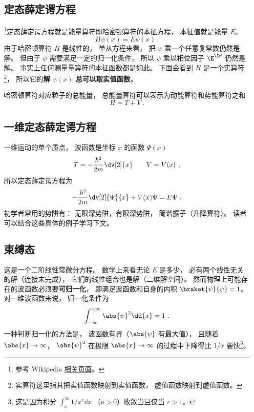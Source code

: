 

\subsection{定态薛定谔方程}
\footnote{参考 Wikipedia \href{https://en.wikipedia.org/wiki/Finite_potential_well}{相关页面}。}定态薛定谔方程就是能量算符即哈密顿算符的本征方程， 本征值就是能量 $E$。
\begin{equation}
H \psi(x) = E \psi(x)~.
\end{equation}
由于哈密顿算符 $H$ 是线性的， 单从方程来看， 把 $\psi$ 乘一个任意复常数仍然是解。 但由于 $\psi$ 需要满足一定的归一化条件， 所以 $\psi$ 乘以相位因子 $\E^{\I\theta}$ 仍然是解。 事实上任何测量量算符的本征函数都是如此。 下面会看到 $H$ 是一个实算符\footnote{实算符这里指其把实值函数映射到实值函数， 虚值函数映射到虚值函数。}， 所以它的\textbf{解 $\psi(x)$ 总可以取实值函数}。

哈密顿算符对应粒子的总能量， 总能量算符可以表示为动能算符和势能算符之和
\begin{equation}
H = T + V~.
\end{equation}

\subsection{一维定态薛定谔方程}
一维运动的单个质点， 波函数是坐标 $x$ 的函数 $\Psi(x)$
\begin{equation}
T = -\frac{\hbar^2}{2m} \dv[2]{x} \qquad V = V(x)~,
\end{equation}
所以定态薛定谔方程为
\begin{equation}\label{eq_SchEq_1}
-\frac{\hbar^2}{2m} \dv[2]{\Psi}{x} + V(x)\Psi = E \Psi~.
\end{equation}
初学者常用的势阱有： 无限深势阱，有限深势阱， 简谐振子（升降算符）。 读者可以结合这些具体的例子学习下文。

\subsection{束缚态}
这是一个二阶线性常微分方程。 数学上来看无论 $E$ 是多少， 必有两个线性无关的解（连接未完成）， 它们的线性组合也是解（二维解空间）。 然而物理上可能存在的波函数必须要\textbf{可归一化}， 即满足波函数和自身的内积 $\braket{\psi}{\psi} = 1$。 对一维波函数来说， 归一化条件为
\begin{equation}
\int_{-\infty}^{+\infty} \abs{\psi}^2 \dd{x} = 1~.
\end{equation}
一种判断归一化的方法是， 波函数有界（$\abs{\psi}$ 有最大值）， 且随着 $\abs{x} \to \infty$，  $\abs{\psi}^2$ 在极限 $\abs{x}\to\infty$ 的过程中下降得比 $1/x$ 要快\footnote{这是因为积分 $\int_a^\infty 1/x^r \dd{x}$ （$a > 0$）收敛当且仅当 $r > 1$。}。

